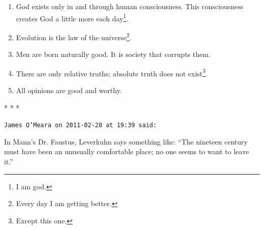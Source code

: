 \begin{enumerate}
\item God exists only in and through human consciousness. This consciousness creates God a little more each day\footnote{I am god.}. 

\item Evolution is the law of the universe\footnote{Every day I am getting better.}. 

\item Men are born naturally good. It is society that corrupts them.

\item There are only relative truths; absolute truth does not exist\footnote{Except this one.}. 

\item All opinions are good and worthy.
\end{enumerate}




\begin{center}* * *\end{center}

\begin{footnotesize}
\begin{sffamily}

\texttt{James O'Meara on 2011-02-28 at 19:39 said:}

In Mann's Dr. Faustus, Leverkuhn says something like: ``The nineteen century must have been an unusually comfortable place; no one seems to want to leave it.''

\end{sffamily}
\end{footnotesize}

